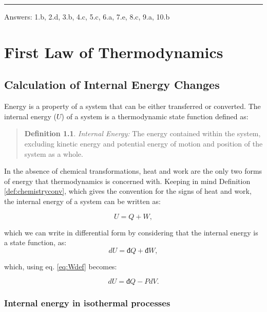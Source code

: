 \documentclass[
  9pt,
]{extbook}
\theoremstyle{definition}
\newtheorem{definition}{Definition}[chapter]
\theoremstyle{definition}
\theoremstyle{definition}
\theoremstyle{definition}
\theoremstyle{remark}
\begin{document}
\begin{center}\rule{0.5\linewidth}{0.5pt}\end{center}

Answers: 1.b, 2.d, 3.b, 4.c, 5.c, 6.a, 7.e, 8.c, 9.a, 10.b

\chapter{First Law of Thermodynamics}\label{FirstLaw}

\section{Calculation of Internal Energy Changes}\label{energyint}

Energy is a property of a system that can be either transferred or converted. The internal energy (\(U\)) of a system is a thermodynamic state function defined as:

\begin{quote}
\begin{definition}
\protect\hypertarget{def:energy}{}\label{def:energy}\emph{Internal Energy:} The energy contained within the system, excluding kinetic energy and potential energy of motion and position of the system as a whole.
\end{definition}
\end{quote}

In the absence of chemical transformations, heat and work are the only two forms of energy that thermodynamics is concerned with. Keeping in mind Definition \ref{def:chemistryconv}, which gives the convention for the signs of heat and work, the internal energy of a system can be written as:

\begin{equation}
  U = Q + W,
  \label{eq:U}
\end{equation}

which we can write in differential form by considering that the internal energy is a state function, as:
\begin{equation}
  dU = đ Q + đ W,
  \label{eq:dU}
\end{equation}

which, using eq. \eqref{eq:Wdef} becomes:

\begin{equation}
  dU = đ Q - PdV.
  \label{eq:dUpdv}
\end{equation}

\subsection{Internal energy in isothermal processes}\label{isothermalE}
\end{document}
